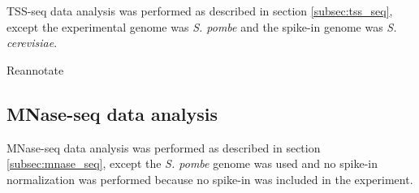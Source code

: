 TSS-seq data analysis was performed as described in section \ref{subsec:tss_seq}, except the experimental genome was \textit{S. pombe} and the spike-in genome was \textit{S. cerevisiae}.

Reannotate

\subsection{MNase-seq data analysis}

MNase-seq data analysis was performed as described in section \ref{subsec:mnase_seq}, except the \textit{S. pombe} genome was used and no spike-in normalization was performed because no spike-in was included in the experiment.

\newpage

\begingroup
    \singlespacing
    
\endgroup

